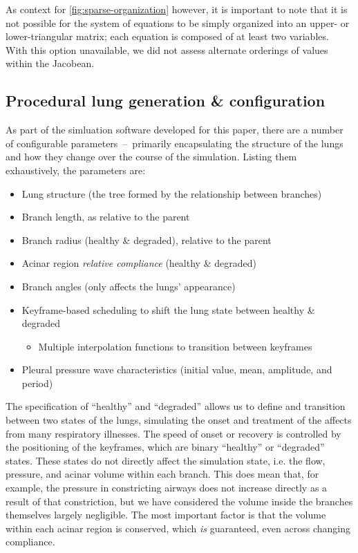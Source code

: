As context for \autoref{fig:sparse-organization} however, it is important to note that it is not
possible for the system of equations to be simply organized into an upper- or lower-triangular
matrix; each equation is composed of at least two variables. With this option unavailable, we did
not assess alternate orderings of values within the Jacobean.

\subsection{Procedural lung generation \& configuration}

As part of the simluation software developed for this paper, there are a number of configurable
parameters~--~primarily encapsulating the structure of the lungs and how they change over the course
of the simulation. Listing them exhaustively, the parameters are:

\begin{itemize}
\item Lung structure (the tree formed by the relationship between branches)
\item Branch length, as relative to the parent
\item Branch radius (healthy \& degraded), relative to the parent
\item Acinar region \textit{relative compliance} (healthy \& degraded)
\item Branch angles (only affects the lungs' appearance)
\item Keyframe-based scheduling to shift the lung state between healthy \& degraded
    \begin{itemize}
    \item Multiple interpolation functions to transition between keyframes
    \end{itemize}
\item Pleural pressure wave characteristics (initial value, mean, amplitude, and period)
\end{itemize}

The specification of ``healthy'' and ``degraded'' allows us to define and transition between two
states of the lungs, simulating the onset and treatment of the affects from many respiratory
illnesses. The speed of onset or recovery is controlled by the positioning of the keyframes, which
are binary ``healthy'' or ``degraded'' states. These states do not directly affect the simulation
state, i.e. the flow, pressure, and acinar volume within each branch. This does mean that, for
example, the pressure in constricting airways does not increase directly as a result of that
constriction, but we have considered the volume inside the branches themselves largely negligible.
The most important factor is that the volume within each acinar region is conserved, which
\textit{is} guaranteed, even across changing compliance.

